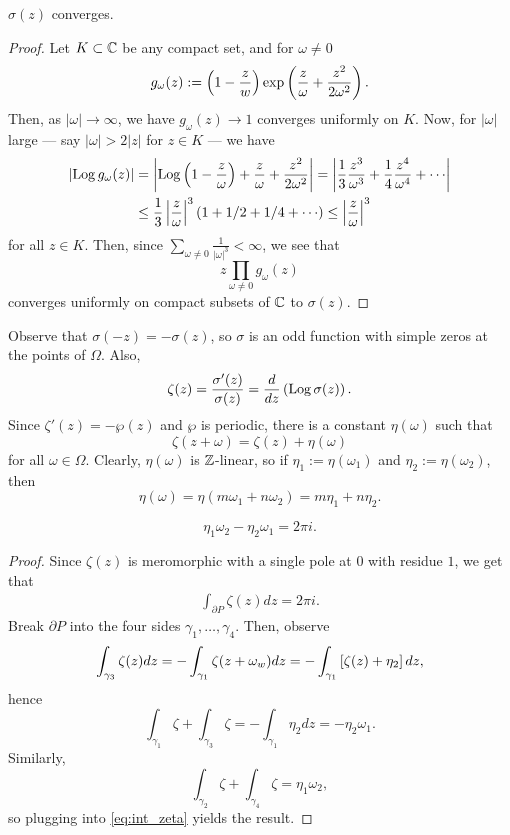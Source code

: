 \documentclass[11pt]{article}
\begin{document}
\begin{prop}
    $\sigma(z)$ converges.
\end{prop}

\begin{proof}
    Let $K \subset \mathbb{C}$ be any compact set, and for $\omega \neq 0$ 
    $$g_\omega(z) :=\left ( 1 - \frac zw \right )\exp\left ( \frac{z}{\omega} + \frac{z^2}{2\omega^2}  \right ).$$
    Then, as $|\omega| \to \infty$, we have $g_\omega(z) \to 1$ converges uniformly on $K$. Now, for $|\omega|$ large --- say $|\omega| > 2|z|$ for $z \in K$ --- we have
    \begin{align*}
        \abs{\Log g_\omega(z)} &= \abs{\Log\paren{1-\frac{z}{\omega}}+\frac{z}{\omega}+\frac{z^2}{2\omega^2}}=\abs{\frac{1}{3}\frac{z^3}{\omega^3} +\frac{1}{4}\frac{z^4}{\omega^4}+\cdots}
        \\ & \leq \frac{1}{3}\abs{\frac{z}{\omega}}^3 \paren{1+ 1/2 + 1/4 + \cdots} \leq \abs{\frac{z}{\omega}}^3
    \end{align*}
    for all $z \in K$. Then, since $\sum_{\omega \neq 0}\frac{1}{|\omega|^3}<\infty$, we see that 
    $$z\prod_{\omega \neq 0}g_\omega(z)$$
    converges uniformly on compact subsets of $\mathbb{C}$ to $\sigma(z)$.
\end{proof}

\begin{rmk}
    Observe that $\sigma(-z) = -\sigma(z)$, so $\sigma$ is an odd function with simple zeros at the points of $\Omega$. Also,
    $$\zeta(z) = \frac{\sigma'(z)}{\sigma(z)}=\frac{d}{dz}\left ( \operatorname{Log}\sigma (z) \right ).$$
    Since $\zeta'(z)=-\wp(z)$ and $\wp$ is periodic, there is a constant $\eta(\omega)$ such that
    $$\zeta(z+\omega)=\zeta(z) + \eta(\omega)$$
    for all $\omega \in \Omega$. Clearly, $\eta(\omega)$ is $\mathbb{Z}$-linear, so if $\eta_1:=\eta(\omega_1)$ and $\eta_2:=\eta(\omega_2)$, then
    $$\eta(\omega) = \eta(m \omega_1 + n\omega_2) = m\eta_1 + n \eta_2.$$
\end{rmk}

\begin{thm}
    $$\eta_1\omega_2 - \eta_2\omega_1 = 2\pi i.$$
\end{thm}

\begin{proof}
    Since $\zeta(z)$ is meromorphic with a single pole at $0$ with residue $1$, we get that
    \begin{align} \label{eq:int_zeta}
        \int_{\partial P}\zeta(z) dz = 2\pi i.
    \end{align}
    Break $\partial P$ into the four sides $\gamma_1,\dots,\gamma_4$. Then, observe
    \begin{align*}
        \int_{\gamma_3}\zeta(z)dz = -\int_{\gamma_1} \zeta(z+\omega_w)dz = -\int_{\gamma_1}\left [ \zeta(z) + \eta_2 \right ]dz,
    \end{align*}
    hence
    $$\int_{\gamma_1}\zeta + \int_{\gamma_3}\zeta = -\int_{\gamma_1}\eta_2dz = -\eta_2\omega_1.$$
    Similarly,
    $$\int_{\gamma_2}\zeta + \int_{\gamma_4}\zeta = \eta_1\omega_2,$$
    so plugging into \eqref{eq:int_zeta} yields the result.
\end{proof}
\end{document}
